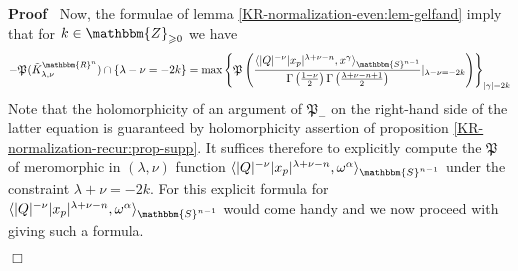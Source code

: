 \documentclass{article}
\newenvironment{proof}{\noindent\textbf{Proof\ }}{\hspace*{\fill}$\Box$\medskip}
\numberwithin{definition}{section}
\numberwithin{lemma}{section}
\numberwithin{proposition}{section}
{\theorembodyfont{\rmfamily}\newtheorem{remark}{Remark}
\numberwithin{remark}{section}
}
\begin{document}
\begin{proof}
  Now, the formulae of lemma \ref{KR-normalization-even:lem-gelfand} imply
  that for $k \in \mathbbm{Z}_{\geqslant 0}$ we have
  \[ -\mathfrak{P}_{} ( \tilde{K}_{\lambda, \nu}^{\mathbbm{R}^n}) \cap \{
     \lambda - \nu = - 2 k \} = \max \left\{ \mathfrak{P}_{} \left(
     \frac{\langle | Q |^{- \nu} | x_p |^{\lambda + \nu - n}, x^{\gamma}
     \rangle_{\mathbbm{S}^{n - 1}}}{\Gamma \left( \frac{1 - \nu}{2} \right)
     \Gamma \left( \frac{\lambda + \nu - n + 1}{2} \right)} |_{\lambda - \nu =
     - 2 k} \right) \right\}_{| \gamma | = 2 k} \]
  Note that the holomorphicity of an argument of $\mathfrak{P}_-$ on the
  right-hand side of the latter equation is guaranteed by holomorphicity
  assertion of proposition \ref{KR-normalization-recur:prop-supp}. It suffices
  therefore to explicitly compute the $\mathfrak{P}$ of meromorphic in $(
  \lambda, \nu)$ function $\langle | Q |^{- \nu} | x_p |^{\lambda + \nu - n},
  \omega^{\alpha} \rangle_{\mathbbm{S}^{n - 1}}$ under the constraint $\lambda
  + \nu = - 2 k$. For this explicit formula for $\langle | Q |^{- \nu} | x_p
  |^{\lambda + \nu - n}, \omega^{\alpha} \rangle_{\mathbbm{S}^{n - 1}}$ would
  come handy and we now proceed with giving such a formula.
  

\end{proof}
\end{document}
